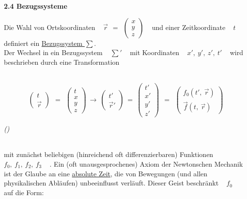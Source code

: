 \documentclass{scrreprt}
\newcounter{ec} %
\newcommand{\iec}{\addtocounter{ec}{1}\begin{flushright}\textit{(\arabic{ec})}\end{flushright}}
\begin{document}
	\begin{flushleft}

	\textbf{2.4 Bezugssysteme}
	
	Die Wahl von Ortskoordinaten ~ $\vec{r} ~~ = ~~ \left(\begin{array}{c} x \\ y \\	z \end{array}\right) $ ~ und einer Zeitkoordinate ~ $t$ ~ definiert ein \underline{Bezugssystem $\sum$}. \\
	
	
	Der Wechsel in ein Bezugssystem ~ $\sum'$ ~ mit Koordinaten ~ $x', ~ y', ~ z', ~ t'$ ~ wird beschrieben durch eine Transformation
	
	~\\
	
	\[ \left(\begin{array}{c} t \\ \vec{r} \end{array}\right) ~~ = ~~ \left(\begin{array}{c} t \\ x \\ y \\ z \end{array}\right) ~ \rightarrow ~ \left(\begin{array}{c} t' \\ \vec{r}' \end{array}\right) ~ = ~ \left(\begin{array}{c} t' \\ x' \\ y' \\ z' \end{array}\right) ~~ = ~~ \left(\begin{array}{c} f_0(t', ~ \vec{r}) \\ \vec{f}(t, ~ \vec{r}) \end{array}\right) \]
	
	\iec
	
	~\\
	
	mit zunächst beliebigen (hinreichend oft differenzierbaren) Funktionen ~ $f_0, ~ f_1, ~ f_2, ~ f_3$ ~ . Ein (oft unausgesprochenes) Axiom der Newtonschen Mechanik ist der Glaube an eine \underline{absolute Zeit}, die von Bewegungen (und allen physikalischen Abläufen) unbeeinflusst verläuft. Dieser Geist beschränkt ~ $f_0$ ~ auf die Form:
	
	~\\
	

\end{flushleft}
\end{document}
